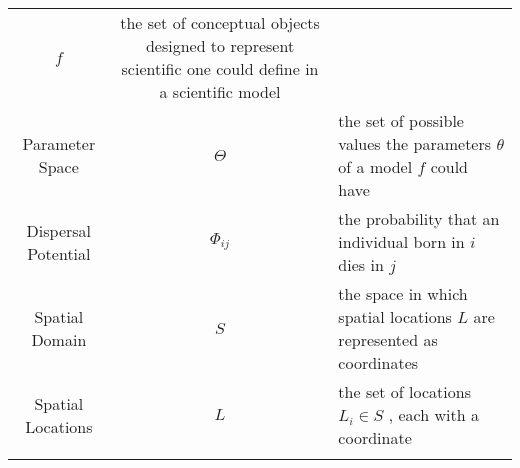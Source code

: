 \begin{longtable}[]{@{}ccl@{}}
\begin{minipage}[t]{0.23\columnwidth}
\(f\)\strut
\end{minipage} & \begin{minipage}[t]{0.42\columnwidth}\raggedright
the set of conceptual objects designed to represent scientific one could
define in a scientific model\strut
\end{minipage}\tabularnewline
\begin{minipage}[t]{0.25\columnwidth}\centering
Parameter Space\strut
\end{minipage} & \begin{minipage}[t]{0.23\columnwidth}\centering
\(\Theta\)\strut
\end{minipage} & \begin{minipage}[t]{0.42\columnwidth}\raggedright
the set of possible values the parameters \(\theta\) of a model \(f\)
could have\strut
\end{minipage}\tabularnewline
\begin{minipage}[t]{0.25\columnwidth}\centering
Dispersal Potential\strut
\end{minipage} & \begin{minipage}[t]{0.23\columnwidth}\centering
\(\Phi_{ij}\)\strut
\end{minipage} & \begin{minipage}[t]{0.42\columnwidth}\raggedright
the probability that an individual born in \(i\) dies in \(j\)\strut
\end{minipage}\tabularnewline
\begin{minipage}[t]{0.25\columnwidth}\centering
Spatial Domain\strut
\end{minipage} & \begin{minipage}[t]{0.23\columnwidth}\centering
\(S\)\strut
\end{minipage} & \begin{minipage}[t]{0.42\columnwidth}\raggedright
the space in which spatial locations \(L\) are represented as
coordinates\strut
\end{minipage}\tabularnewline
\begin{minipage}[t]{0.25\columnwidth}\centering
Spatial Locations\strut
\end{minipage} & \begin{minipage}[t]{0.23\columnwidth}\centering
\(L\)\strut
\end{minipage} & \begin{minipage}[t]{0.42\columnwidth}\raggedright
the set of locations \(L_i \in S\) , each with a coordinate\strut
\end{minipage}\tabularnewline
\begin{minipage}[t]{0.25\columnwidth}\centering

\end{minipage}
\end{longtable}
